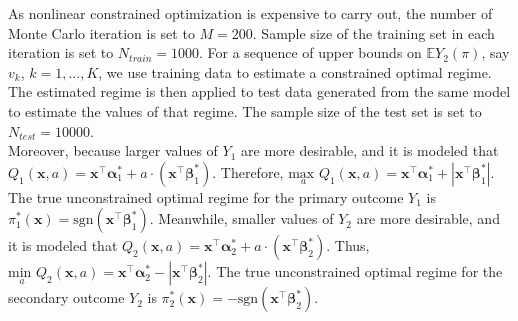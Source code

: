 \documentclass[12pt]{article}
\newcommand{\itl}{\intercal}
\newcommand{\bs}{ \boldsymbol}
\newcommand{\mb}{\mathbb}
\newcommand{\txt}{\text}
\newcommand{\tsgn}{\txt{sgn}}
\begin{document}
As nonlinear constrained optimization is expensive to carry out, the number of Monte Carlo iteration is set to $M = 200$. Sample size of the training set in each iteration is set to $N_{train} = 1000$. For a sequence of upper bounds
on  $\mb{E}Y_2(\pi)$, say $v_{k}$, $k = 1, . . . , K$, we use training data to estimate a constrained optimal regime. The estimated regime is then applied to test data generated from the same model to estimate the values of that regime. The sample size of the test set is set to $N_{test} = 10000$. \\

Moreover, because  larger values of $Y_1$ are more desirable, and it is modeled that $Q_{1}(\bs{x}, a) = \bs{x}^{\itl}\bs{\alpha}^*_1 + a \cdot (\bs{x}^{\itl}\bs{\beta}^*_1)$. Therefore, $\underset{a}{\text{max }} Q_1(\bs{x}, a) = \bs{x}^{\itl}\bs{\alpha}^*_1 + | \bs{x}^{\itl}\bs{\beta}^*_1 |$. The true unconstrained optimal regime for the primary outcome $Y_1$ is $\pi^{*}_{1}(\bs{x}) = \tsgn(\bs{x}^{\itl}\bs{\beta}^*_1)$.  Meanwhile, smaller values of $Y_2$ are more desirable, and it is modeled that $ Q_2(\bs{x}, a) = \bs{x}^{\itl}\bs{\alpha}^*_2 + a\cdot(\bs{x}^{\itl}\bs{\beta}^{*}_{2})$. Thus, $\underset{a}{\text{min }} Q_2(\bs{x}, a) = \bs{x}^{\itl}\bs{\alpha}^{*}_{2} - | \bs{x}^{\itl}\bs{\beta}^{*}_{2} |$. The true unconstrained optimal regime for the secondary outcome $Y_2$ is $\pi^{*}_{2}(\bs{x}) = -\tsgn(\bs{x}^{\itl}\bs{\beta}^{*}_{2})$.\\
\end{document}
